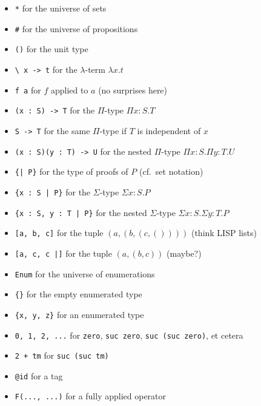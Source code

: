 
\begin{itemize}
\item \verb!*! for the universe of sets
\item \verb!#! for the universe of propositions
\item \verb|()| for the unit type
\item \verb!\ x -> t! for the $\lambda$-term $\lambda x.t$
\item \verb|f a| for $f$ applied to $a$ (no surprises here)
\item \verb!(x : S) -> T! for the $\Pi$-type $\Pi x:S. T$
\item \verb!S -> T! for the same $\Pi$-type if $T$ is independent of $x$
\item \verb!(x : S)(y : T) -> U! for the nested $\Pi$-type $\Pi x:S. \Pi y:T. U$
\item \verb!{| P}! for the type of proofs of $P$ (cf.\ set notation)
\item \verb!{x : S | P}! for the $\Sigma$-type $\Sigma x:S. P$
\item \verb!{x : S, y : T | P}! for the nested $\Sigma$-type $\Sigma x:S. \Sigma y:T. P$
\item \verb![a, b, c]! for the tuple $(a, (b, (c, ())))$ (think LISP lists)
\item \verb![a, c, c |]! for the tuple $(a, (b, c))$ (maybe?)
\item \verb!Enum! for the universe of enumerations
\item \verb!{}! for the empty enumerated type
\item \verb!{x, y, z}! for an enumerated type
\item \verb!0, 1, 2, ...! for \verb!zero!, \verb!suc zero!, \verb!suc (suc zero)!, et cetera
\item \verb!2 + tm! for \verb!suc (suc tm)!
\item \verb!@id! for a tag
\item \verb!F(..., ...)! for a fully applied operator
\end{itemize}


